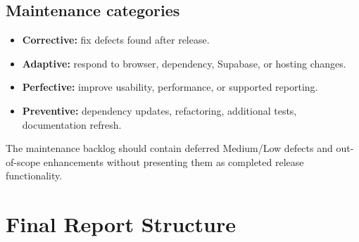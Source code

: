 \documentclass[
  10pt,
  a4paper,
  oneside]{report}
\providecommand{\tightlist}{%
  \setlength{\itemsep}{0pt}\setlength{\parskip}{0pt}}
\begin{document}
\section{Maintenance categories}\label{223-maintenance-categories}

\begin{itemize}
\tightlist
\item
  \textbf{Corrective:} fix defects found after release.
\item
  \textbf{Adaptive:} respond to browser, dependency, Supabase, or
  hosting changes.
\item
  \textbf{Perfective:} improve usability, performance, or supported
  reporting.
\item
  \textbf{Preventive:} dependency updates, refactoring, additional
  tests, documentation refresh.
\end{itemize}

The maintenance backlog should contain deferred Medium/Low defects and
out-of-scope enhancements without presenting them as completed release
functionality.

\chapter{Final Report Structure}\label{23-final-report-structure}
\end{document}
